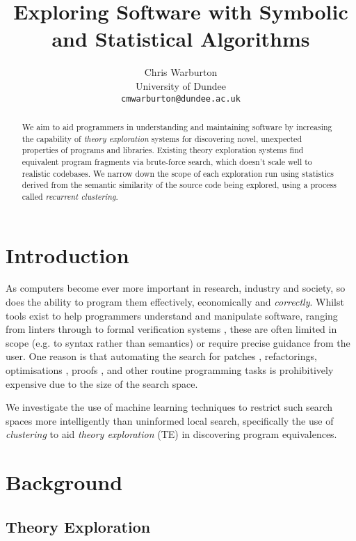 \documentclass[]{sig-alternate}
\title{Exploring Software with Symbolic and Statistical Algorithms}
\author{
          Chris Warburton \\
      University of Dundee \\
      \texttt{cmwarburton@dundee.ac.uk}
    }
\date{}
\begin{document}
\maketitle
\begin{abstract}
We aim to aid programmers in understanding and maintaining software
by increasing the capability of \emph{theory exploration} systems for
discovering novel, unexpected properties of programs and libraries.
Existing theory exploration systems find equivalent program fragments via brute-force
search, which doesn't scale well to realistic codebases. We narrow down
the scope of each exploration run using statistics derived from the
semantic similarity of the source code being explored, using a process
called \emph{recurrent clustering}.
\end{abstract}

\section{Introduction}\label{introduction}

As computers become ever more important in research, industry and
society, so does the ability to program them effectively, economically
and \emph{correctly}. Whilst tools exist to help programmers understand
and manipulate software, ranging from linters \cite{Johnson78lint} through to formal
verification systems \cite{boyer1983proof}, these are often limited in scope (e.g. to syntax rather than semantics) or require precise guidance from the user. One
reason is that automating the search for patches \cite{Forrest.Nguyen.Weimer.ea:2009}, refactorings,
optimisations \cite{phothilimthana2016scaling}, proofs \cite{rosen2012proving}, and other routine programming tasks is
prohibitively expensive due to the size of the search space.

We investigate the use of machine learning techniques to restrict such
search spaces more intelligently than uninformed local search,
specifically the use of \emph{clustering} to aid \emph{theory
exploration} (TE) in discovering program equivalences.

\section{Background}\label{background}

\subsection{Theory Exploration}\label{theory-exploration}
\end{document}
